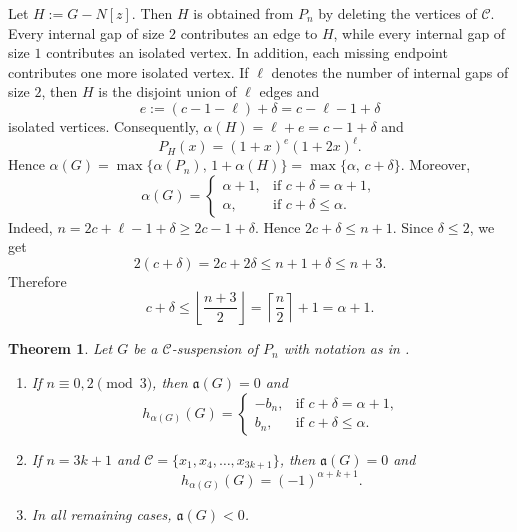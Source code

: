 \documentclass[12pt]{amsart}
\theoremstyle{plain}
\newtheorem{thm}{Theorem}[section]
\theoremstyle{definition}
\begin{document}
\begin{remark}\label{rem:delta}
Let \(H:=G-N[z]\). Then \(H\) is obtained from \(P_n\) by deleting the vertices of
\(\mathcal C\). Every internal gap of size \(2\) contributes an edge to \(H\),
while every internal gap of size \(1\) contributes an isolated vertex. In
addition, each missing endpoint contributes one more isolated vertex. If \(\ell\)
denotes the number of internal gaps of size \(2\), then \(H\) is the disjoint
union of \(\ell\) edges and
\[
e:=(c-1-\ell)+\delta=c-\ell-1+\delta
\]
isolated vertices. Consequently, \(\alpha(H)=\ell+e=c-1+\delta\) and
\[
P_H(x)=(1+x)^e(1+2x)^\ell.
\]
Hence \(\alpha(G)=\max\{\alpha(P_n),\,1+\alpha(H)\}
=\max\{\alpha,\,c+\delta\}\).
Moreover,
\[
\alpha(G)=
\begin{cases}
\alpha+1,& \text{if }c+\delta=\alpha+1,\\[4pt]
\alpha,& \text{if }c+\delta\le \alpha.
\end{cases}
\]
Indeed,   \(n=2c+\ell-1+\delta\ge 2c-1+\delta\). Hence \(2c+\delta\le n+1\).
Since \(\delta\le 2\), we get
\[
2(c+\delta)=2c+2\delta\le n+1+\delta\le n+3.
\]
Therefore
\[
c+\delta\le \left\lfloor \frac{n+3}{2}\right\rfloor
=\left\lceil \frac n2\right\rceil+1=\alpha+1.
\]
\end{remark}

\begin{thm}\label{thm:suspension_path}
Let \(G\) be a \(\mathcal C\)-suspension of \(P_n\) with notation as in
.
\begin{enumerate}[label=(\alph*)]
\item If \(n\equiv 0,2 \pmod 3\), then \(\mathfrak a(G)=0\) and
\[
h_{\alpha(G)}(G)=
\begin{cases}
-b_n,& \text{if }c+\delta=\alpha+1,\\[4pt]
b_n,& \text{if }c+\delta\le \alpha.
\end{cases}
\]

\item If \(n=3k+1\) and \(\mathcal C=\{x_1,x_4,\dots,x_{3k+1}\}\), then
\(\mathfrak a(G)=0\) and
\[
h_{\alpha(G)}(G)=(-1)^{\alpha+k+1}.
\]

\item In all remaining cases, \(\mathfrak a(G)<0\).
\end{enumerate}
\end{thm}
\end{document}
